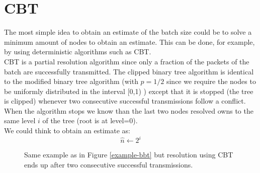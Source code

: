 \documentclass[12pt,a4paper]{report}
\begin{document}
\section{CBT}
\label{cbt-estimation}
The most simple idea to obtain an estimate of the batch size could be to solve a minimum amount of nodes to obtain an estimate. This can be done, for example, by using deterministic algorithms such as CBT.\\
CBT is a partial resolution algorithm since only a fraction of the packets of the batch are successfully transmitted.
The clipped binary tree algorithm is identical to the modified binary tree algorithm (with $p=1/2$ since we require the nodes to be uniformly distributed in the interval [0,1) ) except that it is stopped (the tree is clipped) whenever two consecutive successful transmissions follow a conflict.\\
When the algorithm stops we know than the last two nodes resolved owns to the same level $i$ of the tree (root is at level=0).\\
We could think to obtain an estimate as:
\begin{equation}
\hat{n}\gets2^{i}
\end{equation}

\begin{figure}[H]
\centering
{}
\caption[\emph{CBT}: example]{ Same example as in Figure \ref{example-bbt} but resolution using CBT ends up after two consecutive successful transmissions.}
\end{figure}
\end{document}
